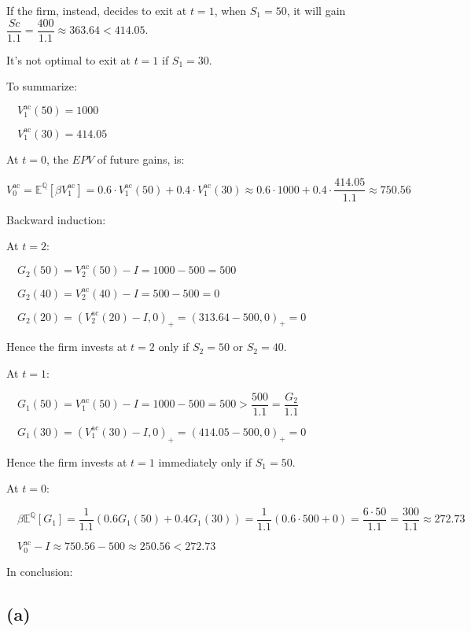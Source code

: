 \documentclass{article}
\begin{document}
If the firm, instead, decides to exit at $t=1$, when $S_{1}=50$, it will gain $\dfrac{Sc}{1.1}=\dfrac{400}{1.1}\approx363.64<414.05$.

It's not optimal to exit at $t=1$ if $S_{1}=30$.

To summarize:

$\quad V^{\text{ac}}_{1}\left(50\right)=1000$

$\quad V^{\text{ac}}_{1}\left(30\right)=414.05$

At $t=0$, the $EPV$ of future gains, is:

$V^{\text{ac}}_{0}=\mathbb{E} ^{\mathbb{Q} }\left[\beta V^{\text{ac}}_{1}\right]=0.6\cdot V^{\text{ac}}_{1}\left(50\right)+0.4\cdot V^{\text{ac}}_{1}\left(30\right)\approx0.6\cdot1000+0.4\cdot\dfrac{414.05}{1.1}\approx750.56$

Backward induction:

At $t=2$:

$\quad G_{2}\left(50\right)=V^{\text{ac}}_{2}\left(50\right)-I=1000-500=500$

$\quad G_{2}\left(40\right)=V^{\text{ac}}_{2}\left(40\right)-I=500-500=0$

$\quad G_{2}\left(20\right)=\left(V^{\text{ac}}_{2}\left(20\right)-I, 0\right)_{+}=\left(313.64-500, 0\right)_{+}=0$

Hence the firm invests at $t=2$ only if $S_{2}=50$ or $S_{2}=40$.

At $t=1$:

$\quad G_{1}\left(50\right)=V^{\text{ac}}_{1}\left(50\right)-I=1000-500=500>\dfrac{500}{1.1}=\dfrac{G_{2}}{1.1}$

$\quad G_{1}\left(30\right)=\left(V^{\text{ac}}_{1}\left(30\right)-I, 0\right)_{+}=\left(414.05-500, 0\right)_{+}=0$

Hence the firm invests at $t=1$ immediately only if $S_{1}=50$.

At $t=0$:

$\quad \beta\mathbb{E} ^{\mathbb{Q} }\left[G_{1}\right]=\dfrac{1}{1.1}\left(0.6G_{1}\left(50\right)+0.4G_{1}\left(30\right)\right)=\dfrac{1}{1.1}\left(0.6\cdot500+0\right)=\dfrac{6\cdot50}{1.1}=\dfrac{300}{1.1}\approx272.73$

$\quad V^{\text{ac}}_{0}-I\approx750.56-500\approx250.56<272.73$

In conclusion:

\subsection*{(a)}
\end{document}
